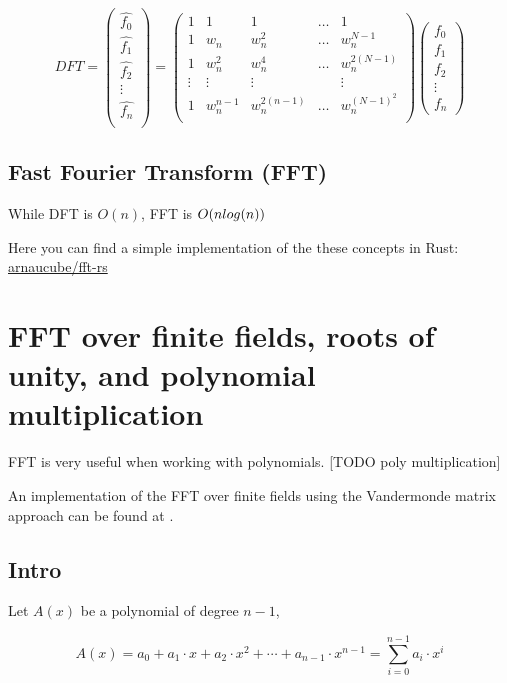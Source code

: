 \documentclass{article}
\theoremstyle{definition}
\begin{document}
$$
DFT =
\begin{pmatrix}
\hat{f_0}\\
\hat{f_1}\\
\hat{f_2}\\
\vdots\\
\hat{f_n}\\
\end{pmatrix}=
\begin{pmatrix}
1 & 1 & 1 & \ldots & 1 \\
1 & w_n & w_n^2 & \ldots & w_n^{N-1} \\
1 & w_n^2 & w_n^4 & \ldots & w_n^{2(N-1)} \\
\vdots & \vdots & \vdots & & \vdots\\
1 & w_n^{n-1} & w_n^{2(n-1)} & \ldots & w_n^{(N-1)^2} \\
\end{pmatrix}
\begin{pmatrix}
f_0 \\ f_1 \\ f_2 \\ \vdots \\ f_n
\end{pmatrix}
$$

\subsection{Fast Fourier Transform (FFT)}
While DFT is $O(n)$, FFT is $O(n \space log(n))$

Here you can find a simple implementation of the these concepts in Rust: \href{https://github.com/arnaucube/fft-rs}{arnaucube/fft-rs} \cite{fftrs}


\section{FFT over finite fields, roots of unity, and polynomial multiplication}

FFT is very useful when working with polynomials. [TODO poly multiplication]

An implementation of the FFT over finite fields using the Vandermonde matrix approach can be found at \cite{fftsage}.

\subsection{Intro}
Let $A(x)$ be a polynomial of degree $n-1$,

$$
A(x) = a_0 + a_1 \cdot x + a_2 \cdot x^2 + \cdots + a_{n-1} \cdot x^{n-1} = \sum_{i=0}^{n-1} a_i \cdot x^i
$$
\end{document}
